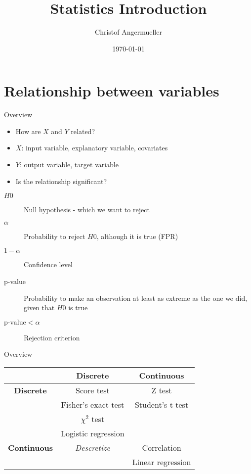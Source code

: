 \documentclass{beamer}
\author{Christof Angermueller}
\title{Statistics Introduction}
\date{\today}
\begin{document}
\section{Relationship between variables}
\begin{frame}
\tableofcontents[currentsection]
\end{frame}

\begin{frame}{Overview}
  \begin{itemize}
    \item How are $X$ and $Y$ related?
    \item $X$: input variable, explanatory variable, covariates
    \item $Y$: output variable, target variable
    \item Is the relationship significant?
  \end{itemize}
  \begin{definition}
    \begin{description}
      \item[$H0$] Null hypothesis - which we want to reject
      \item[$\alpha$] Probability to reject $H0$, although it is true (FPR)
      \item[$1-\alpha$] Confidence level
      \item[p-value] Probability to make an observation at least as extreme as
        the one we did, given that $H0$ is true
      \item[$\text{p-value} < \alpha$] Rejection criterion
    \end{description}
  \end{definition}
\end{frame}

\begin{frame}{Overview}
  \begin{table}
    \begin{tabular}{c|c|c}
      \toprule
      & \textbf{Discrete} & \textbf{Continuous} \\ \hline
      \textbf{Discrete} & Score test & Z test \\
      & Fisher's exact test & Student's t test \\
      & $\chi^2$ test & \\
      & Logistic regression & \\ \hline
      \textbf{Continuous} & \textit{Descretize} & Correlation \\
      &  & Linear regression \\
      \bottomrule
    \end{tabular}
  \end{table}
\end{frame}
\end{document}
